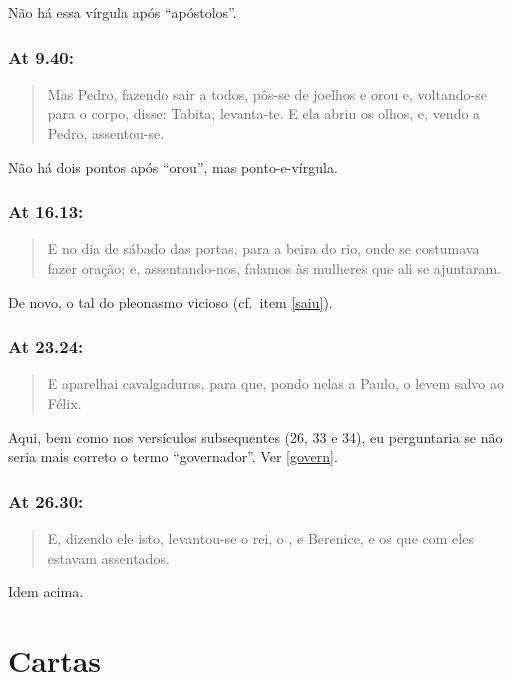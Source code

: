 Não há essa vírgula após ``apóstolos''.


\subsection*{At 9.40:}
\begin{quote}
    \small
Mas Pedro, fazendo sair a todos, pôs-se de joelhos e orou\uwave{:} e, voltando-se para o corpo, disse: Tabita, levanta-te. E ela abriu os olhos, e, vendo a Pedro, assentou-se.
\end{quote}

Não há dois pontos após ``orou'', mas ponto-e-vírgula.


\subsection*{At 16.13:}
\begin{quote}
    \small
E no dia de sábado  das portas, para a beira do rio, onde se costumava fazer oração; e, assentando-nos, falamos às mulheres que ali se ajuntaram.
\end{quote}

De novo, o tal do pleonasmo vicioso (cf.~item \ref{saiu}).

\subsection*{At 23.24:}
\begin{quote}
    \small
E aparelhai cavalgaduras, para que, pondo nelas a Paulo, o levem salvo ao  Félix.
\end{quote}

Aqui, bem como nos versículos subsequentes (26, 33 e 34), eu
perguntaria se não seria mais correto o termo ``governador''. Ver \ref{govern}.

\subsection*{At 26.30:}
\begin{quote}
    \small
E, dizendo ele isto, levantou-se o rei, o , e Berenice, e os que com eles estavam assentados.
\end{quote}
Idem acima.

\chapter{Cartas}
